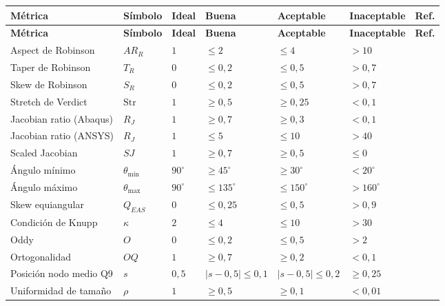 \documentclass[11pt,a4paper]{article}
\begin{document}
\renewcommand{\arraystretch}{1.2}
\begin{longtable}{lllllll}
\toprule
\textbf{M\'etrica} & \textbf{S\'imbolo} & \textbf{Ideal} & \textbf{Buena} & \textbf{Aceptable} & \textbf{Inaceptable} & \textbf{Ref.} \\
\midrule
\endfirsthead
\toprule
\textbf{M\'etrica} & \textbf{S\'imbolo} & \textbf{Ideal} & \textbf{Buena} & \textbf{Aceptable} & \textbf{Inaceptable} & \textbf{Ref.} \\
\midrule
\endhead
Aspect de Robinson & $AR_R$ & $1$ & $\le 2$ & $\le 4$ & $>10$ & \cite{Robinson1987,Verdict2007} \\
Taper de Robinson & $T_R$ & $0$ & $\le 0{,}2$ & $\le 0{,}5$ & $>0{,}7$ & \cite{Robinson1987,Verdict2007} \\
Skew de Robinson & $S_R$ & $0$ & $\le 0{,}2$ & $\le 0{,}5$ & $>0{,}7$ & \cite{Robinson1987,Verdict2007} \\
Stretch de Verdict & $\mathrm{Str}$ & $1$ & $\ge 0{,}5$ & $\ge 0{,}25$ & $<0{,}1$ & \cite{Verdict2007,Knupp2003} \\
Jacobian ratio (Abaqus) & $R_J$ & $1$ & $\ge 0{,}7$ & $\ge 0{,}3$ & $<0{,}1$ & \cite{AbaqusCAE} \\
Jacobian ratio (ANSYS) & $R_J$ & $1$ & $\le 5$ & $\le 10$ & $>40$ & \cite{AnsysMesh} \\
Scaled Jacobian & $SJ$ & $1$ & $\ge 0{,}7$ & $\ge 0{,}5$ & $\le 0$ & \cite{Verdict2007,Knupp2003} \\
\'Angulo m\'inimo & $\theta_{\min}$ & $90^\circ$ & $\ge 45^\circ$ & $\ge 30^\circ$ & $<20^\circ$ & \cite{FluentUG,Verdict2007} \\
\'Angulo m\'aximo & $\theta_{\max}$ & $90^\circ$ & $\le 135^\circ$ & $\le 150^\circ$ & $>160^\circ$ & \cite{FluentUG,Verdict2007} \\
Skew equiangular & $Q_{EAS}$ & $0$ & $\le 0{,}25$ & $\le 0{,}5$ & $>0{,}9$ & \cite{FluentUG} \\
Condici\'on de Knupp & $\kappa$ & $2$ & $\le 4$ & $\le 10$ & $>30$ & \cite{Knupp2000} \\
Oddy & $O$ & $0$ & $\le 0{,}2$ & $\le 0{,}5$ & $>2$ & \cite{Knupp2000} \\
Ortogonalidad & $OQ$ & $1$ & $\ge 0{,}7$ & $\ge 0{,}2$ & $<0{,}1$ & \cite{FluentUG} \\
Posici\'on nodo medio Q9 & $s$ & $0{,}5$ & $|s-0{,}5|\le 0{,}1$ & $|s-0{,}5|\le 0{,}2$ & $\ge 0{,}25$ & \cite{Bathe2014,Barsoum1976} \\
Uniformidad de tama\~no & $\rho$ & $1$ & $\ge 0{,}5$ & $\ge 0{,}1$ & $<0{,}01$ & \cite{Verdict2007} \\
\bottomrule
\end{longtable}
\end{document}
